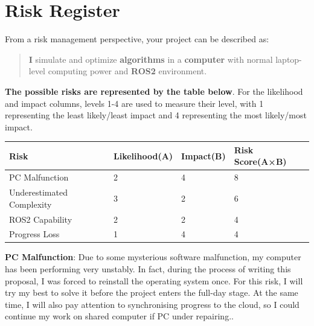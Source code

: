\documentclass[12pt, oneside]{article}
\begin{document}
\pagebreak

\section{Risk Register}

From a risk management perspective, your project can be described as:
\begin{quote}
    \textbf{I} simulate and optimize \textbf{algorithms} in a \textbf{computer} with normal laptop-level computing power and \textbf{ROS2} environment.
\end{quote}

\textbf{The possible risks are represented by the table below}. For the likelihood and impact columns, levels 1-4 are used to measure their level, with 1 representing the least likely/least impact and 4 representing the most likely/most impact.


\begin{table}[]
\begin{tabular}{|l|l|l|l|}
\hline
Risk                      & Likelihood(A) & Impact(B) & Risk Score(A×B) \\ \hline
PC Malfunction            & 2             & 4         & 8               \\ \hline
Underestimated Complexity & 3             & 2         & 6               \\ \hline
ROS2 Capability           & 2             & 2         & 4               \\ \hline
Progress Loss             & 1             & 4         & 4               \\ \hline
\end{tabular}
\end{table}

\FloatBarrier

\textbf{PC Malfunction}: Due to some mysterious software malfunction, my computer has been performing very unstably. In fact, during the process of writing this proposal, I was forced to reinstall the operating system once. For this risk, I will try my best to solve it before the project enters the full-day stage. At the same time, I will also pay attention to synchronising progress to the cloud, so I could continue my work on shared computer if PC under repairing..
\end{document}
